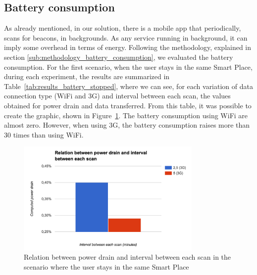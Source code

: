 \subsection{Battery consumption}
\label{sub:results_battery_consumption}
As already mentioned, in our solution, there is a mobile app that periodically, scans for beacons, in backgrounds.
As any service running in background, it can imply some overhead in terms of energy.
Following the methodology, explained in section \ref{sub:methodology_battery_consumption}, we evaluated the battery consumption.
For the first scenario, when the user stays in the same Smart Place, during each experiment, the results are summarized in Table~\ref{tab:results_battery_stopped}, where we can see, for each variation of data connection type (\gls{WiFi} and \gls{3G}) and interval between each scan, the values obtained for power drain and data transferred.
From this table, it was possible to create the graphic, shown in Figure~\ref{fig:results_battery_stopped}.
The battery consumption using \gls{WiFi} are almost zero.
However, when using \gls{3G}, the battery consumption raises more than 30 times than using \gls{WiFi}.



\begin{figure}[!ht]
  \centering
    \includegraphics[width=0.8\textwidth, keepaspectratio]{images/results_battery_stopped}
    \caption{Relation between power drain and interval between each scan in the scenario where the user stays in the same Smart Place}
    \label{fig:results_battery_stopped}
\end{figure}

